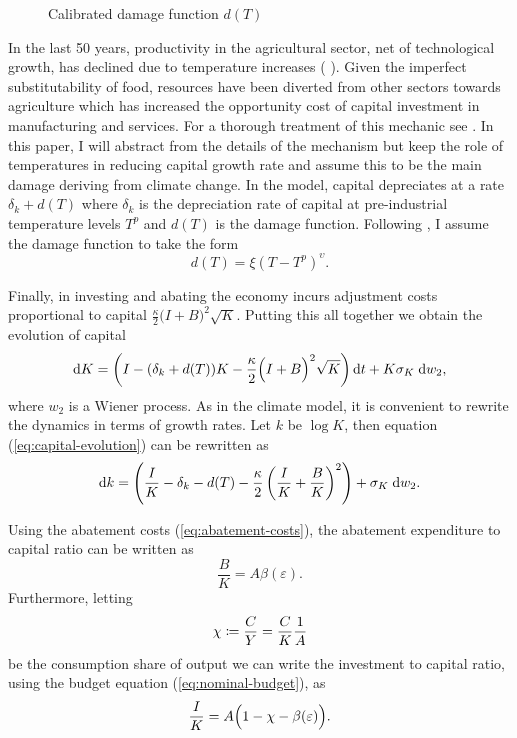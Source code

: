 \documentclass[../../main.tex]{subfiles}
\begin{document}
\begin{wrapfigure}{r}{0.5\textwidth}
    \centering
    \caption{Calibrated damage function $d(T)$}
    \label{fig:damage}
\end{wrapfigure}In the last 50 years, productivity in the agricultural sector, net of technological growth, has declined due to temperature increases (\citeauthor{dell_temperature_2009} \citeyear{dell_temperature_2009}). Given the imperfect substitutability of food, resources have been diverted from other sectors towards agriculture which has increased the opportunity cost of capital investment in manufacturing and services. For a thorough treatment of this mechanic see . In this paper, I will abstract from the details of the mechanism but keep the role of temperatures in reducing capital growth rate and assume this to be the main damage deriving from climate change. In the model, capital depreciates at a rate $\delta_k +  d(T) $ where $\delta_k$ is the depreciation rate of capital at pre-industrial temperature levels $T^p$ and $d(T)$ is the damage function. Following , I assume the damage function to take the form \begin{equation}
    d(T) = \xi (T - T^p)^{\upsilon}.
\end{equation} 

Finally, in investing and abating the economy incurs adjustment costs proportional to capital $\frac{\kappa}{2} \big(I + B \big)^2 \sqrt{K}$. Putting this all together we obtain the evolution of capital \begin{equation} \label{eq:capital-evolution}
    \mathrm{d}K = \left( I - (\delta_k + d(T)) K - \frac{\kappa}{2} \Big(I + B\Big)^2 \sqrt{K} \right) \mathrm{d}t + K \sigma_K \; \mathrm{d}w_2,
\end{equation} where $w_2$ is a Wiener process. As in the climate model, it is convenient to rewrite the dynamics in terms of growth rates. Let $k$ be $\log K$, then equation (\ref{eq:capital-evolution}) can be rewritten as \begin{equation} \label{eq:capital-evolution:log:level}
    \text{d}k = \left( \frac{I}{K} - \delta_k - d(T) - \frac{\kappa}{2} \left(\frac{I}{K} + \frac{B}{K}\right)^2 \right) + \sigma_K \; \mathrm{d}w_2.
\end{equation}

Using the abatement costs (\ref{eq:abatement-costs}), the abatement expenditure to capital ratio can be written as \begin{equation}
    \frac{B}{K} = A \beta(\varepsilon).
\end{equation} Furthermore, letting \begin{equation}
    \chi \coloneqq \frac{C}{Y} = \frac{C}{K} \frac{1}{A}
\end{equation} be the consumption share of output we can write the investment to capital ratio, using the budget equation (\ref{eq:nominal-budget}), as \begin{equation}
    \frac{I}{K} = A \Big(1 - \chi - \beta(\varepsilon)\Big).
\end{equation}
\end{document}
